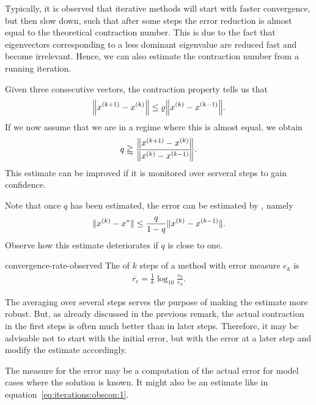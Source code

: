 \begin{remark}
  Typically, it is observed that iterative methods will start with
  faster convergence, but then slow down, such that after some steps
  the error reduction is almost equal to the theoretical contraction
  number. This is due to the fact that eigenvectors corresponding to a
  less dominant eigenvalue are reduced fast and become
  irrelevant. Hence, we can also estimate the contraction number from
  a running iteration.

  Given three consecutive vectors, the contraction property tells us
  that
  \begin{gather}
    \norm*{x^{(k+1)} - x^{(k)}} \le \rho \norm*{x^{(k)}-x^{(k-1)}}.
  \end{gather}
  If we now assume that we are in a regime where this is almost equal, we obtain
  \begin{gather}
    q \gtrapprox \frac{\norm*{x^{(k+1)} - x^{(k)}}}{\norm*{x^{(k)} - x^{(k-1)}}}.
  \end{gather}
  This estimate can be improved if it is monitored over serveral steps
  to gain confidence.

  Note that once $q$ has been estimated, the error can be estimated by
  , namely
  \begin{gather}
    \norm{x^{(k)} - x^*} \le \frac{q}{1-q} \norm{x^{(k)}-x^{(k-1)}}.
  \end{gather}
  Observe how this estimate deteriorates if $q$ is close to one.
\end{remark}

\begin{Definition}{convergence-rate-observed}
  The  of $k$ steps of a
  method with error measure $e_k$ is
  \begin{gather}
    \label{eq:iterations:obscon:1}
    \overline{r_c} = \frac1k \log_{10}\frac{e_0}{e_k}.
  \end{gather}
\end{Definition}

\begin{remark}
  The averaging over several steps serves the purpose of making the
  estimate more robust. But, as already discussed in the previous
  remark, the actual contraction in the first steps is often much
  better than in later steps. Therefore, it may be advisable not to
  start with the initial error, but with the error at a later step and
  modify the estimate accordingly.

  The measure for the error may be a computation of the actual error
  for model cases where the solution is known. It might also be an
  estimate like in equation~\eqref{eq:iterations:obscon:1}.
\end{remark}

